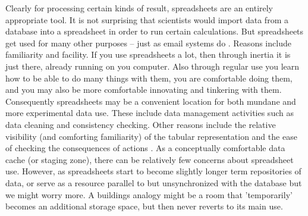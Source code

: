 Clearly for processing certain kinds of result, spreadsheets are an entirely appropriate tool. It is not surprising that scientists would import data from a database into a spreadsheet in order to run certain calculations. But spreadsheets get used for many other purposes – just as email systems do \cite{bellotti2005quality}. Reasons include familiarity and facility. If you use spreadsheets a lot, then through inertia it is just there, already running on you computer. Also through regular use you learn how to be able to do many things with them, you are comfortable doing them, and you may also be more comfortable innovating and tinkering with them.  Consequently spreadsheets may be a convenient location for both mundane and more experimental data use. These include data management activities such as data cleaning and consistency checking.  Other reasons include the relative visibility (and comforting familiarity) of the tabular representation and the ease of checking the consequences of actions \cite{nardi1991twinkling}. As a conceptually comfortable data cache (or staging zone), there can be relatively few concerns about spreadsheet use. However, as spreadsheets start to become slightly longer term repositories of data, or serve as a resource parallel to but unsynchronized with the database but  we might worry more. A buildings analogy might be a room that 'temporarily' becomes an additional storage space, but then never reverts to its main use.

